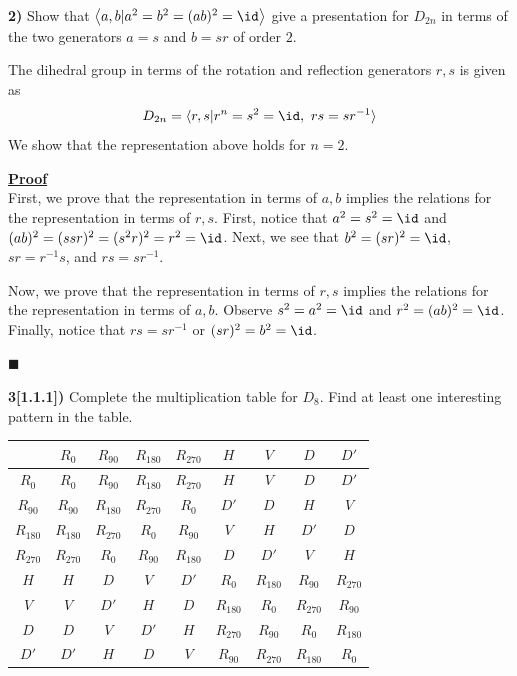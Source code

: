 \documentclass[12pt,a4paper]{article}
\newcommand{\prob}[2]{\textbf{#1)} #2}
\newenvironment{proof}
{
\textbf{\underline{Proof}} \\
}
{
\begin{flushright}
$\blacksquare$
\end{flushright}}
\begin{document}
\prob{2}{Show that $\left<a,b | a^2=b^2=(ab)^2=\id \right>$ give a presentation for $D_{2n}$ in terms of the two generators $a = s$ and $b = sr$ of order $2$.}

The dihedral group in terms of the rotation and reflection generators $r,s$ is given as 
\begin{align*}
D_{2n} = \langle r,s | r^{n} = s^2 = \id,~rs=sr^{-1} \rangle
\end{align*}
We show that the representation above holds for $n = 2$.

\begin{proof}
First, we prove that the representation in terms of $a,b$ implies the relations for the representation in terms of $r,s$. First, notice that $a^2 = s^2 = \id$ and $(ab)^2 = (ssr)^2 = (s^2r)^2 = r^2 = \id$. Next, we see that $b^2 = (sr)^2 = \id$, $sr = r^{-1}s$, and $rs = sr^{-1}$.

Now, we prove that the representation in terms of $r,s$ implies the relations for the representation in terms of $a,b$. Observe $s^2 = a^2 = \id$ and $r^2 = (ab)^2 = \id$. Finally, notice that $rs = sr^{-1}$ or $(sr)^2 = b^2 = \id$.
\end{proof}

\prob{3[1.1.1]}{Complete the multiplication table for $D_8$. Find at least one interesting pattern in the table.}

\begin{table}[H]
 \begin{center}
  \begin{tabular}{c|cccccccc}
    & $R_{0}$ & $R_{90}$ & $R_{180}$ & $R_{270}$ & $H$ & $V$ & $D$ & $D'$ \\
  \hline
  $R_{0}$ & $R_{0}$ & $R_{90}$ & $R_{180}$ & $R_{270}$ & $H$ & $V$ & $D$ & $D'$ \\ 
  $R_{90}$ & $R_{90}$ & $R_{180}$ & $R_{270}$ & $R_{0}$ & $D'$ & $D$ & $H$ & $V$ \\
  $R_{180}$ & $R_{180}$ & $R_{270}$ & $R_{0}$ & $R_{90}$ & $V$ & $H$ & $D'$ & $D$ \\
  $R_{270}$ & $R_{270}$ & $R_{0}$ & $R_{90}$ & $R_{180}$ & $D$ & $D'$ & $V$ & $H$ \\
  $H$ & $H$ & $D$ & $V$ & $D'$ & $R_{0}$ & $R_{180}$ & $R_{90}$ & $R_{270}$ \\
  $V$ & $V$ & $D'$ & $H$ & $D$ & $R_{180}$ & $R_{0}$ & $R_{270}$ & $R_{90}$ \\
  $D$ & $D$ & $V$ & $D'$ & $H$ & $R_{270}$ & $R_{90}$ & $R_{0}$ & $R_{180}$ \\
  $D'$ & $D'$ & $H$ & $D$ & $V$ & $R_{90}$ & $R_{270}$ & $R_{180}$ & $R_{0}$ \\
  \end{tabular}
 \end{center}
\end{table}
\end{document}
